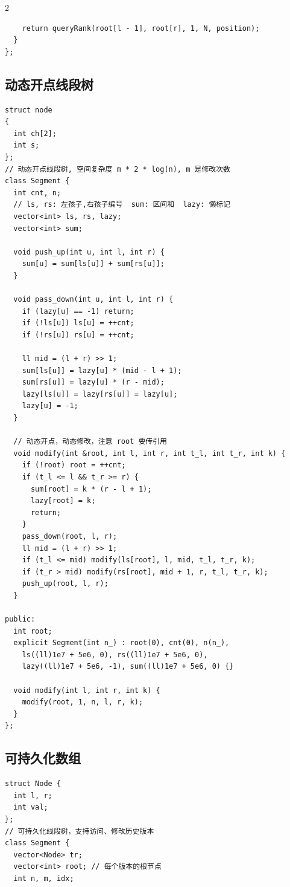 \documentclass[10pt]{article}
\begin{document}
\begin{multicols*}{2}
\begin{verbatim}
    return queryRank(root[l - 1], root[r], 1, N, position);
  }
};
\end{verbatim}


\subsection{动态开点线段树}


\begin{verbatim}
struct node
{
  int ch[2];
  int s;
};
// 动态开点线段树, 空间复杂度 m * 2 * log(n), m 是修改次数
class Segment {
  int cnt, n;
  // ls, rs: 左孩子,右孩子编号  sum: 区间和  lazy: 懒标记
  vector<int> ls, rs, lazy;
  vector<int> sum;

  void push_up(int u, int l, int r) {
    sum[u] = sum[ls[u]] + sum[rs[u]];
  }

  void pass_down(int u, int l, int r) {
    if (lazy[u] == -1) return;
    if (!ls[u]) ls[u] = ++cnt;
    if (!rs[u]) rs[u] = ++cnt;

    ll mid = (l + r) >> 1;
    sum[ls[u]] = lazy[u] * (mid - l + 1);
    sum[rs[u]] = lazy[u] * (r - mid);
    lazy[ls[u]] = lazy[rs[u]] = lazy[u];
    lazy[u] = -1;
  }

  // 动态开点，动态修改，注意 root 要传引用
  void modify(int &root, int l, int r, int t_l, int t_r, int k) {
    if (!root) root = ++cnt;
    if (t_l <= l && t_r >= r) {
      sum[root] = k * (r - l + 1);
      lazy[root] = k;
      return;
    }
    pass_down(root, l, r);
    ll mid = (l + r) >> 1;
    if (t_l <= mid) modify(ls[root], l, mid, t_l, t_r, k);
    if (t_r > mid) modify(rs[root], mid + 1, r, t_l, t_r, k);
    push_up(root, l, r);
  }

public:
  int root;
  explicit Segment(int n_) : root(0), cnt(0), n(n_),
    ls((ll)1e7 + 5e6, 0), rs((ll)1e7 + 5e6, 0),
    lazy((ll)1e7 + 5e6, -1), sum((ll)1e7 + 5e6, 0) {}

  void modify(int l, int r, int k) {
    modify(root, 1, n, l, r, k);
  }
};
\end{verbatim}


\subsection{可持久化数组}


\begin{verbatim}
struct Node {
  int l, r;
  int val;
};
// 可持久化线段树，支持访问、修改历史版本
class Segment {
  vector<Node> tr;
  vector<int> root; // 每个版本的根节点
  int n, m, idx;


\end{verbatim}
\end{multicols*}
\end{document}
